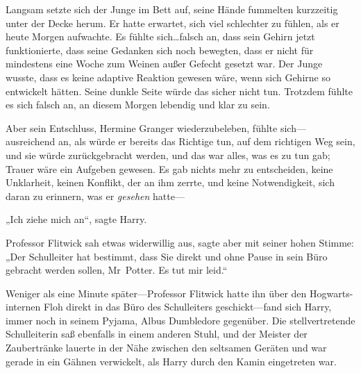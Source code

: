 Langsam setzte sich der Junge im Bett auf, seine Hände fummelten kurzzeitig unter der Decke herum. Er hatte erwartet, sich viel schlechter zu fühlen, als er heute Morgen aufwachte. Es fühlte sich…falsch an, dass sein Gehirn jetzt funktionierte, dass seine Gedanken sich noch bewegten, dass er nicht für mindestens eine Woche zum Weinen außer Gefecht gesetzt war. Der Junge wusste, dass es keine adaptive Reaktion gewesen wäre, wenn sich Gehirne so entwickelt hätten. Seine dunkle Seite würde das sicher nicht tun. Trotzdem fühlte es sich falsch an, an diesem Morgen lebendig und klar zu sein.

Aber sein Entschluss, Hermine Granger wiederzubeleben, fühlte sich—ausreichend an, als würde er bereits das Richtige tun, auf dem richtigen Weg sein, und sie würde zurückgebracht werden, und das war alles, was es zu tun gab; Trauer wäre ein Aufgeben gewesen. Es gab nichts mehr zu entscheiden, keine Unklarheit, keinen Konflikt, der an ihm zerrte, und keine Notwendigkeit, sich daran zu erinnern, was er \emph{gesehen} hatte—

„Ich ziehe mich an“, sagte Harry.

Professor Flitwick sah etwas widerwillig aus, sagte aber mit seiner hohen Stimme: „Der Schulleiter hat bestimmt, dass Sie direkt und ohne Pause in sein Büro gebracht werden sollen, Mr~Potter. Es tut mir leid.“

Weniger als eine Minute später—Professor Flitwick hatte ihn über den Hogwarts-internen Floh direkt in das Büro des Schulleiters geschickt—fand sich Harry, immer noch in seinem Pyjama, Albus Dumbledore gegenüber. Die stellvertretende Schulleiterin saß ebenfalls in einem anderen Stuhl, und der Meister der Zaubertränke lauerte in der Nähe zwischen den seltsamen Geräten und war gerade in ein Gähnen verwickelt, als Harry durch den Kamin eingetreten war.

